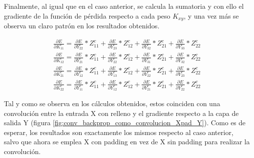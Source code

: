Finalmente, al igual que en el caso anterior, se calcula la sumatoria y con ello el gradiente de la función de pérdida respecto a cada peso $K_{xy}$, y una vez más se observa un claro patrón en los resultados obtenidos.

\begin{gather}
	\frac{\partial E}{\partial K^c_{11}} = \frac{\partial E}{\partial Y^c_{22}} * Z^c_{11} + \frac{\partial E}{\partial Y^c_{23}} * Z^c_{12} + \frac{\partial E}{\partial Y^c_{32}} * Z^c_{21} + \frac{\partial E}{\partial Y^c_{33}} * Z^c_{22} \\
	\frac{\partial E}{\partial K^c_{12}} = \frac{\partial E}{\partial Y^c_{21}} * Z^c_{11} + \frac{\partial E}{\partial Y^c_{22}} * Z^c_{12} + \frac{\partial E}{\partial Y^c_{31}} * Z^c_{21} + \frac{\partial E}{\partial Y^c_{32}} * Z^c_{22}\\
	\frac{\partial E}{\partial K^c_{21}} = \frac{\partial E}{\partial Y^c_{12}} * Z^c_{11} + \frac{\partial E}{\partial Y^c_{13}} * Z^c_{12} + \frac{\partial E}{\partial Y^c_{22}} * Z^c_{21} + \frac{\partial E}{\partial Y^c_{23}} * Z^c_{22} \\
	\frac{\partial E}{\partial K^c_{22}} = \frac{\partial E}{\partial Y^c_{11}} * Z^c_{11} + \frac{\partial E}{\partial Y^c_{12}} * Z^c_{12} + \frac{\partial E}{\partial Y^c_{21}} * Z^c_{21} + \frac{\partial E}{\partial Y^c_{22}} * Z^c_{22}
\end{gather}

Tal y como se observa en los cálculos obtenidos, estos coinciden con una convolución entre la entrada X con relleno y el gradiente respecto a la capa de salida Y (figura \ref{fig:conv_backprop_como_convolucion_Xpad_Y}). Como es de esperar, los resultados son exactamente los mismos respecto al caso anterior, salvo que ahora se emplea X con padding en vez de X sin padding para realizar la convolución.

